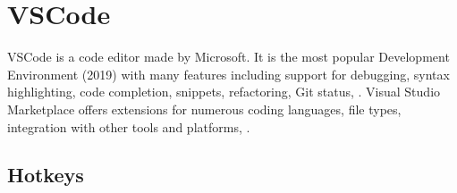 \section{VSCode}

VSCode is a code editor made by Microsoft. It is the most popular Development Environment (2019) \cite{devSurvey2019} with many features including support for debugging, syntax highlighting, code completion, snippets, refactoring, Git status, \etc. Visual Studio Marketplace \cite{vscode_marketplace} offers extensions for numerous coding languages, file types, integration with other tools and platforms, \etc.\\

\subsection{Hotkeys}

